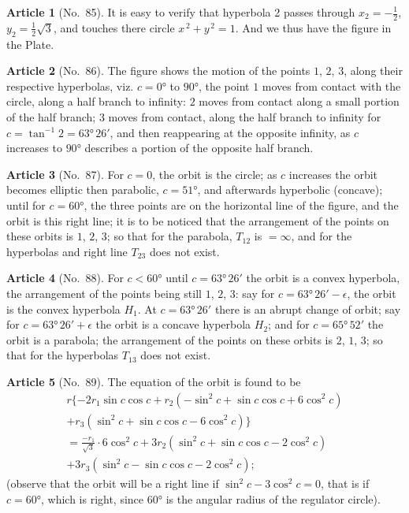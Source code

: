 \documentclass[11pt,a4paper]{article}
\theoremstyle{definition}
\newtheorem{art}{Article}
\begin{document}
\begin{art}[No.~85]
It is easy to verify that hyperbola 2 passes through $x_2 = -\frac{1}{2}$, $y_2 = \frac{1}{2}\surd 3$, and touches there circle $x^{\,2} + y^{\,2} = 1$. And we thus have the figure in the Plate.
\end{art}

\begin{art}[No.~86]
The figure shows the motion of the points $1$, $2$, $3$, along their respective hyperbolas, viz. $c = 0°$ to $90°$, the point $1$ moves from contact with the circle, along a half branch to infinity: $2$ moves from contact along a small portion of the half branch; $3$ moves from contact, along the half branch to infinity for $c = \tan^{-1} 2 = 63°\, 26'$, and then reappearing at the opposite infinity, as $c$ increases to $90°$ describes a portion of the opposite half branch.
\end{art}

\begin{art}[No.~87]
For $c = 0$, the orbit is the circle; as $c$ increases the orbit becomes elliptic then parabolic, $c = 51°$, and afterwards hyperbolic (concave); until for $c = 60°$, the three points are on the horizontal line of the figure, and the orbit is this right line; it is to be noticed that the arrangement of the points on these orbits is $1$, $2$, $3$; so that for the parabola, $T_{12}$ is $= \infty$, and for the hyperbolas and right line $T_{23}$ does not exist.
\end{art}

\begin{art}[No.~88]
For $c < 60°$ until $c = 63°\, 26'$ the orbit is a convex hyperbola, the arrangement of the points being still $1$, $2$, $3$: say for $c = 63°\, 26' - \epsilon$, the orbit is the convex hyperbola $H_1$. At $c = 63°\, 26'$ there is an abrupt change of orbit; say for $c = 63°\, 26' + \epsilon$ the orbit is a concave hyperbola $H_2$; and for $c = 65°\, 52'$ the orbit is a parabola; the arrangement of the points on these orbits is $2$, $1$, $3$; so that for the hyperbolas $T_{13}$ does not exist.
\end{art}


\begin{art}[No.~89]
The equation of the orbit is found to be
\begin{multline*}
r\{-2r_1 \sin c \cos c + r_2(-\sin^2 c + \sin c \cos c + 6\cos^2 c)\\
+ r_3(\sin^2 c + \sin c \cos c - 6\cos^2 c)\}\\
= \frac{-r_1}{\surd 3} \cdot 6\cos^2 c + 3r_2(\sin^2 c + \sin c \cos c - 2\cos^2 c)\\
+ 3r_3(\sin^2 c - \sin c \cos c - 2\cos^2 c);
\end{multline*}
(observe that the orbit will be a right line if $\sin^2 c - 3\cos^2 c = 0$, that is if $c = 60°$, which is right, since $60°$ is the angular radius of the regulator circle).
\end{art}
\end{document}
